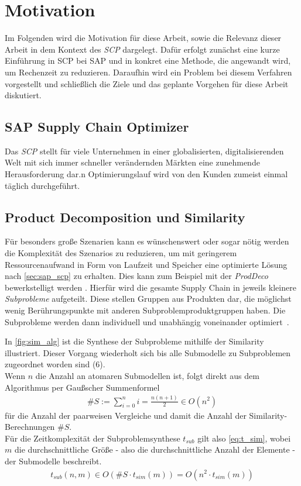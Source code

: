 \chapter{Motivation}

Im Folgenden wird die Motivation für diese Arbeit, sowie die Relevanz dieser Arbeit in dem Kontext des \textit{\ac{SCP}} dargelegt. Dafür erfolgt zunächst eine kurze Einführung in \ac{SCP} bei SAP und in konkret eine Methode, die angewandt wird, um Rechenzeit zu reduzieren. Daraufhin wird ein Problem bei diesem Verfahren vorgestellt und schließlich die Ziele und das geplante Vorgehen für diese Arbeit diskutiert.

\section{SAP Supply Chain Optimizer} \label{sec:sap_scp}

Das \textit{\ac{SCP}} stellt für viele Unternehmen in einer globalisierten, digitalisierenden Welt mit sich immer schneller verändernden Märkten eine zunehmende Herausforderung dar.n Optimierungslauf wird von den Kunden zumeist  einmal täglich durchgeführt.

\section{Product Decomposition und Similarity} \label{sec:proddeco}

Für besonders große Szenarien kann es wünschenswert oder sogar nötig werden die Komplexität des Szenarios zu reduzieren, um mit geringerem Ressourcenaufwand in Form von Laufzeit und Speicher eine optimierte Lösung   nach \autoref{sec:sap_scp} zu erhalten. Dies kann zum Beispiel mit der \textit{\ac{ProdDeco}} bewerkstelligt werden \cite{.20220812}. Hierfür wird die gesamte Supply Chain in jeweils kleinere \textit{Subprobleme} aufgeteilt. Diese stellen Gruppen aus Produkten dar, die möglichst wenig Berührungspunkte mit anderen Subproblemproduktgruppen haben. Die Subprobleme werden dann individuell und unabhängig voneinander optimiert~\cite[S.~31--33]{Sandner.01.09.1998}.   

In \autoref{fig:sim_alg} ist die Synthese der Subprobleme mithilfe der Similarity illustriert. Dieser Vorgang wiederholt sich bis alle Submodelle zu Subproblemen zugeordnet worden sind (6). \\ %
Wenn $n$ die Anzahl an atomaren Submodellen ist, folgt direkt aus dem Algorithmus per Gaußscher Summenformel
\begin{align}
\label{eq:num_comp} \#S := \sum_{i=0}^{n} i = \frac{n(n+1)}{2} \in O(n^2)
\end{align}
für die Anzahl der paarweisen Vergleiche und damit die Anzahl der Similarity-Berechnungen $\#S$. \\
Für die Zeitkomplexität der Subproblemsynthese $t_{sub}$ gilt also \autoref{eq:t_sim}, wobei $m$ die durchschnittliche Größe - also die durchschnittliche Anzahl der Elemente - der Submodelle beschreibt.
\begin{align}
	\label{eq:t_sim} t_{sub}(n, m) \in O(\#S \cdot t_{sim}(m)) = O(n^2 \cdot t_{sim}(m)) 
\end{align}

